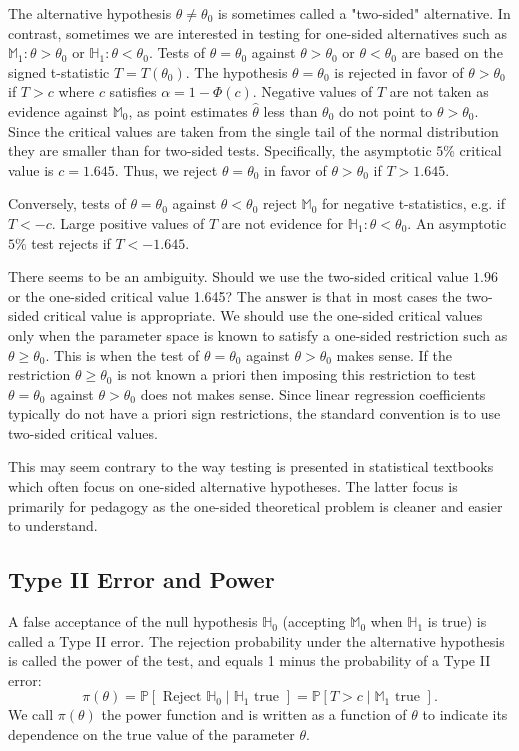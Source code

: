 \documentclass[10pt]{article}
\begin{document}
The alternative hypothesis $\theta \neq \theta_{0}$ is sometimes called a "two-sided" alternative. In contrast, sometimes we are interested in testing for one-sided alternatives such as $\mathbb{M}_{1}: \theta>\theta_{0}$ or $\mathbb{H}_{1}: \theta<\theta_{0}$. Tests of $\theta=\theta_{0}$ against $\theta>\theta_{0}$ or $\theta<\theta_{0}$ are based on the signed t-statistic $T=T\left(\theta_{0}\right)$. The hypothesis $\theta=\theta_{0}$ is rejected in favor of $\theta>\theta_{0}$ if $T>c$ where $c$ satisfies $\alpha=1-\Phi(c)$. Negative values of $T$ are not taken as evidence against $\mathbb{M}_{0}$, as point estimates $\widehat{\theta}$ less than $\theta_{0}$ do not point to $\theta>\theta_{0}$. Since the critical values are taken from the single tail of the normal distribution they are smaller than for two-sided tests. Specifically, the asymptotic $5 \%$ critical value is $c=1.645$. Thus, we reject $\theta=\theta_{0}$ in favor of $\theta>\theta_{0}$ if $T>1.645$.

Conversely, tests of $\theta=\theta_{0}$ against $\theta<\theta_{0}$ reject $\mathbb{M}_{0}$ for negative t-statistics, e.g. if $T<-c$. Large positive values of $T$ are not evidence for $\mathbb{H}_{1}: \theta<\theta_{0}$. An asymptotic $5 \%$ test rejects if $T<-1.645$.

There seems to be an ambiguity. Should we use the two-sided critical value $1.96$ or the one-sided critical value 1.645? The answer is that in most cases the two-sided critical value is appropriate. We should use the one-sided critical values only when the parameter space is known to satisfy a one-sided restriction such as $\theta \geq \theta_{0}$. This is when the test of $\theta=\theta_{0}$ against $\theta>\theta_{0}$ makes sense. If the restriction $\theta \geq \theta_{0}$ is not known a priori then imposing this restriction to test $\theta=\theta_{0}$ against $\theta>\theta_{0}$ does not makes sense. Since linear regression coefficients typically do not have a priori sign restrictions, the standard convention is to use two-sided critical values.

This may seem contrary to the way testing is presented in statistical textbooks which often focus on one-sided alternative hypotheses. The latter focus is primarily for pedagogy as the one-sided theoretical problem is cleaner and easier to understand.

\subsection{Type II Error and Power}
A false acceptance of the null hypothesis $\mathbb{H}_{0}$ (accepting $\mathbb{M}_{0}$ when $\mathbb{H}_{1}$ is true) is called a Type II error. The rejection probability under the alternative hypothesis is called the power of the test, and equals 1 minus the probability of a Type II error:
$$
\pi(\theta)=\mathbb{P}\left[\text { Reject } \mathbb{H}_{0} \mid \mathbb{H}_{1} \text { true }\right]=\mathbb{P}\left[T>c \mid \mathbb{M}_{1} \text { true }\right] .
$$
We call $\pi(\theta)$ the power function and is written as a function of $\theta$ to indicate its dependence on the true value of the parameter $\theta$.
\end{document}
